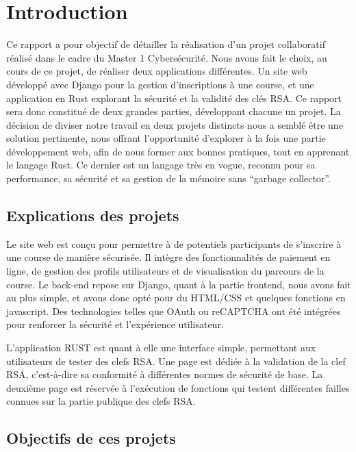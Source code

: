 \documentclass[12pt]{article} %
\begin{document}
\section{Introduction}

		Ce rapport a pour objectif de détailler la réalisation d'un projet collaboratif réalisé dans le cadre du Master 1 Cybersécurité. Nous avons fait le choix, au cours de ce projet, de réaliser deux applications différentes. Un site web développé avec Django pour la gestion d'inscriptions à une course, et une application en Rust explorant la sécurité et la validité des clés RSA. Ce rapport sera donc constitué de deux grandes parties, développant chacune un projet.
	La décision de diviser notre travail en deux projets distincts nous a semblé être une solution pertinente, nous offrant l'opportunité d'explorer à la fois une partie développement web, afin de nous former aux bonnes pratiques, tout en apprenant le langage Rust. Ce dernier est un langage très en vogue, reconnu pour sa performance, sa sécurité et sa gestion de la mémoire sans “garbage collector”.

	
			
		
	\subsection{Explications des projets}
		Le site web est conçu pour permettre à de potentiels participants de s'inscrire à une course de manière sécurisée. Il intègre des fonctionnalités de paiement en ligne, de gestion des profils utilisateurs et de visualisation du parcours de la course. Le back-end repose sur Django, quant à la partie frontend, nous avons fait au plus simple, et avons donc opté pour du HTML/CSS et quelques fonctions en javascript. Des technologies telles que OAuth ou reCAPTCHA ont été intégrées pour renforcer la sécurité et l’expérience utilisateur.

	L’application RUST est quant à elle une interface simple, permettant aux utilisateurs de tester des clefs RSA. Une page est dédiée à la validation de la clef RSA, c'est-à-dire sa conformité à différentes normes de sécurité de base. La deuxième page est réservée à l'exécution de fonctions qui testent différentes failles connues sur la partie publique des clefs RSA.

	\subsection{Objectifs de ces projets}
\end{document}
